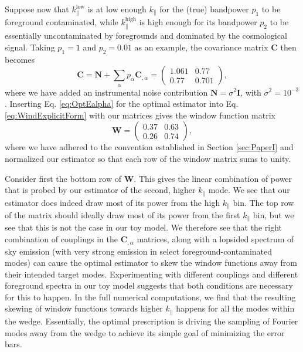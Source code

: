 \documentclass[twocolumn,aps,prd,nofootinbib,showpacs]{revtex4-1}
\begin{document}
Suppose now that $k_\parallel^{\textrm{low}}$ is at low enough $k_\parallel$ for the (true) bandpower $p_1$ to be foreground contaminated, while $k_\parallel^{\textrm{high}}$ is high enough for its bandpower $p_2$ to be essentially uncontaminated by foregrounds and dominated by the cosmological signal.  Taking $p_1 = 1$ and $p_2 = 0.01$ as an example, the covariance matrix $\mathbf{C}$ then becomes
\begin{equation}
\mathbf{C} =  \mathbf{N} + \sum_\alpha p_\alpha \mathbf{C}_{,\alpha} = \left( \begin{array}{cc}
1.061 & 0.77 \\
0.77 & 0.701
\end{array}
\right),
\end{equation}
where we have added an instrumental noise contribution $\mathbf{N} = \sigma^2 \mathbf{I}$, with $\sigma^2 = 10^{-3}$.  Inserting Eq. \eqref{eq:OptEalpha} for the optimal estimator into Eq. \eqref{eq:WindExplicitForm} with our matrices gives the window function matrix
\begin{equation}
\mathbf{W} =
\left( \begin{array}{cc}
0.37 & 0.63 \\
0.26 & 0.74
\end{array}
\right),
\end{equation}
where we have adhered to the convention established in Section \ref{sec:PaperI} and normalized our estimator so that each row of the window matrix sums to unity.

Consider first the bottom row of $\mathbf{W}$.  This gives the linear combination of power that is probed by our estimator of the second, higher $k_\parallel$ mode.  We see that our estimator does indeed draw most of its power from the high $k_\parallel$ bin.  The top row of the matrix should ideally draw most of its power from the first $k_\parallel$ bin, but we see that this is not the case in our toy model.  We therefore see that the right combination of couplings in the $\mathbf{C}_{,\alpha}$ matrices, along with a lopsided spectrum of sky emission (with very strong emission in select foreground-contaminated modes) can cause the optimal estimator to skew the window functions away from their intended target modes.  Experimenting with different couplings and different foreground spectra in our toy model suggests that both conditions are necessary for this to happen.  In the full numerical computations, we find that the resulting skewing of window functions towards higher $k_\parallel$ happens for all the modes within the wedge.  Essentially, the optimal prescription is driving the sampling of Fourier modes away from the wedge to achieve its simple goal of minimizing the error bars.
\end{document}
